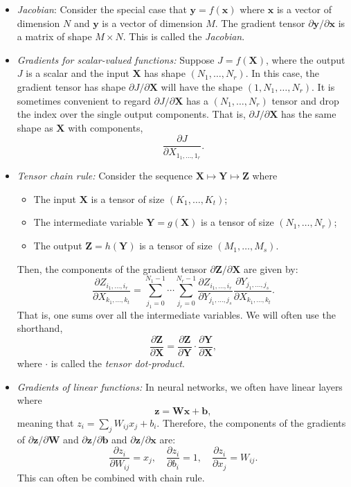 \documentclass[11pt]{article}
\def\beq{\begin{equation}}
\def\eeq{\end{equation}}
\newcommand{\bbf}{\mathbf{b}}
\newcommand{\xbf}{\mathbf{x}}
\newcommand{\ybf}{\mathbf{y}}
\newcommand{\zbf}{\mathbf{z}}
\newcommand{\Wbf}{\mathbf{W}}
\newcommand{\Xbf}{\mathbf{X}}
\newcommand{\Ybf}{\mathbf{Y}}
\newcommand{\Zbf}{\mathbf{Z}}
\begin{document}
\begin{itemize}
\item \emph{Jacobian}: Consider the special case that $\ybf = f(\xbf)$ where
$\xbf$ is a vector of dimension $N$ and $\ybf$ is a vector of dimension $M$.
The gradient tensor $\partial \ybf/\partial \xbf$ is a matrix of shape $M \times N$.
This is called the \emph{Jacobian}.

\item \emph{Gradients for scalar-valued functions:}  Suppose $J = f(\Xbf)$,
where the output $J$ is a scalar and the input $\Xbf$ has shape $(N_1,\ldots,N_r)$.
In this case, the gradient tensor has shape $\partial J/\partial \Xbf$ will have the shape
$(1,N_1,\ldots,N_r)$.  It is sometimes convenient to regard $\partial J/\partial \Xbf$ has a 
$(N_1,\ldots,N_r)$ tensor and drop the index over the single output components.  That is,
$\partial J/\partial \Xbf$ has the same shape as $\Xbf$ with components,
\[
    \frac{\partial J}{\partial X_{1_1,\ldots,1_r}}.
\]

\item \emph{Tensor chain rule:}  
Consider the sequence $\Xbf \mapsto \Ybf \mapsto \Zbf$ where
\begin{itemize}
  \item The input $\Xbf$ is a tensor of size $(K_1,\ldots,K_t)$;
  \item The intermediate variable $\Ybf=g(\Xbf)$ is a tensor of size $(N_1,\ldots,N_r)$; 
  \item The output $\Zbf=h(\Ybf)$ is a tensor of size $(M_1,\ldots,M_s)$.
\end{itemize}
Then, the components of the gradient tensor $\partial \Zbf/\partial \Xbf$ are given by:
\[
    \frac{\partial Z_{i_1,\ldots,i_r}}{\partial X_{k_1,\ldots,k_t}}
    = \sum_{j_1=0}^{N_1-1}\cdots \sum_{j_r=0}^{N_r-1} \frac{\partial Z_{i_1,\ldots,i_r}}{\partial Y_{j_1,\ldots,j_s}}
    \frac{\partial Y_{j_1,\ldots,j_s}}{\partial X_{k_1,\ldots,k_t}}.
\]
That is, one sums over all the intermediate variables.  We will often use the shorthand,
\[
    \frac{\partial \Zbf}{\partial \Xbf} = \frac{\partial \Zbf}{\partial \Ybf}\cdot \frac{\partial \Ybf}{\partial \Xbf},
\]
where $\cdot$ is called the \emph{tensor dot-product}.



\item \emph{Gradients of linear functions:}  In neural networks, we often
have linear layers where
\[
    \zbf = \Wbf \xbf + \bbf,
\]
meaning that $z_i = \sum_j W_{ij}x_j + b_i$.
Therefore, the components of the gradients of $\partial \zbf/\partial \Wbf$ and $\partial \zbf/\partial \bbf$ and
$\partial \zbf/\partial \xbf$ are:
\beq \label{eq:gradlinvec}
    \frac{\partial z_i}{\partial W_{ij}}=x_j, \quad
    \frac{\partial z_i}{\partial b_i}=1, \quad
    \frac{\partial z_i}{\partial x_j}=W_{ij}.
\eeq
This can often be combined with chain rule.

\end{itemize}
\end{document}
